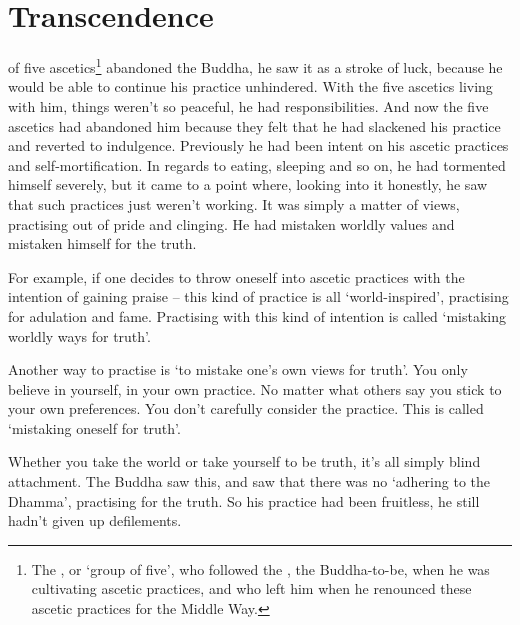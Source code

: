 
\chapter{Transcendence}

 of five ascetics\footnote{The , or `group of five', who followed the , the Buddha-to-be, when he was cultivating ascetic practices, and who left him when he renounced these ascetic practices for the Middle Way.} abandoned the Buddha, he saw it as a stroke of luck, because he would be able to continue his practice unhindered. With the five ascetics living with him, things weren't so peaceful, he had responsibilities. And now the five ascetics had abandoned him because they felt that he had slackened his practice and reverted to indulgence. Previously he had been intent on his ascetic practices and self-mortification. In regards to eating, sleeping and so on, he had tormented himself severely, but it came to a point where, looking into it honestly, he saw that such practices just weren't working. It was simply a matter of views, practising out of pride and clinging. He had mistaken worldly values and mistaken himself for the truth.

For example, if one decides to throw oneself into ascetic practices with the intention of gaining praise -- this kind of practice is all `world-inspired', practising for adulation and fame. Practising with this kind of intention is called `mistaking worldly ways for truth'.

Another way to practise is `to mistake one's own views for truth'. You only believe in yourself, in your own practice. No matter what others say you stick to your own preferences. You don't carefully consider the practice. This is called `mistaking oneself for truth'.

Whether you take the world or take yourself to be truth, it's all simply blind attachment. The Buddha saw this, and saw that there was no `adhering to the Dhamma', practising for the truth. So his practice had been fruitless, he still hadn't given up defilements.

